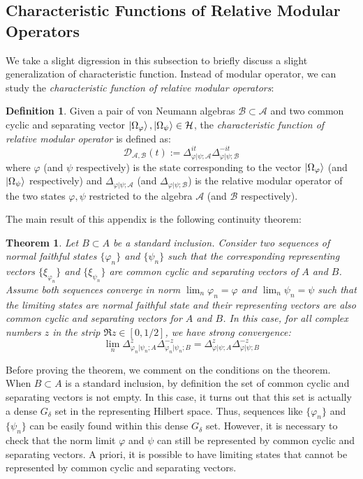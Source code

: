 \documentclass[a4paper,11pt]{article}
\newtheorem{theorem}{Theorem}
\theoremstyle{definition}
\newtheorem{definition}{Definition}[section]
\begin{document}
\subsection{Characteristic Functions of Relative Modular Operators}\label{app:relcharacter}
We take a slight digression in this subsection to briefly discuss a slight generalization of characteristic function. Instead of modular operator, we can study the \textit{characteristic function of relative modular operators}:
\begin{definition}
    Given a pair of von Neumann algebras $\mathcal{B}\subset\mathcal{A}$ and two common cyclic and separating vector $\ket{\Omega_\varphi}, \ket{\Omega_\psi}\in\mathcal{H}$, the \textit{characteristic function of relative modular operator} is defined as:
    \begin{equation}
        \mathcal{D}_{\mathcal{A}, \mathcal{B}}(t) := \Delta_\mathcal{\varphi|\psi;\mathcal{A}}^{it}\Delta_{\varphi|\psi;\mathcal{B}}^{-it}
    \end{equation}
    where $\varphi$ (and $\psi$ respectively) is the state corresponding to the vector $\ket{\Omega_\varphi}$ (and $\ket{\Omega_\psi}$ respectively) and $\Delta_{\varphi|\psi;\mathcal{A}}$ (and $\Delta_{\varphi|\psi;\mathcal{B}}$) is the relative modular operator of the two states $\varphi,\psi$ restricted to the algebra $\mathcal{A}$ (and $\mathcal{B}$ respectively).
\end{definition}
The main result of this appendix is the following continuity theorem:
\begin{theorem}
    Let $B\subset A$ be a standard inclusion. Consider two sequences of normal faithful states $\{\varphi_n\}$ and $\{\psi_n\}$ such that the corresponding representing vectors $\{\xi_{\varphi_n}\}$ and $\{\xi_{\psi_n}\}$ are common cyclic and separating vectors of $A$ and $B$. Assume both sequences converge in norm $\lim_n\varphi_n = \varphi$ and $\lim_n\psi_n = \psi$ such that the limiting states are normal faithful state and their representing vectors are also common cyclic and separating vectors for $A$ and $B$. In this case, for all complex numbers $z$ in the strip $\Re{z}\in[0, 1/2]$, we have strong convergence:
    \begin{equation}
        \lim_n \Delta_{\varphi_n|\psi_n;A}^z \Delta_{\varphi_n|\psi_n;B}^{-z} = \Delta^z_{\varphi|\psi;A}\Delta^{-z}_{\varphi|\psi; B}
    \end{equation}
\end{theorem}
Before proving the theorem, we comment on the conditions on the theorem. When $B\subset A$ is a standard inclusion, by definition the set of common cyclic and separating vectors is not empty. In this case, it turns out that this set is actually a dense $G_\delta$ set in the representing Hilbert space. Thus, sequences like $\{\varphi_n\}$ and $\{\psi_n\}$ can be easily found within this dense $G_\delta$ set. However, it is necessary to check that the norm limit $\varphi$ and $\psi$ can still be represented by common cyclic and separating vectors. A priori, it is possible to have limiting states that cannot be represented by common cyclic and separating vectors.
\end{document}
